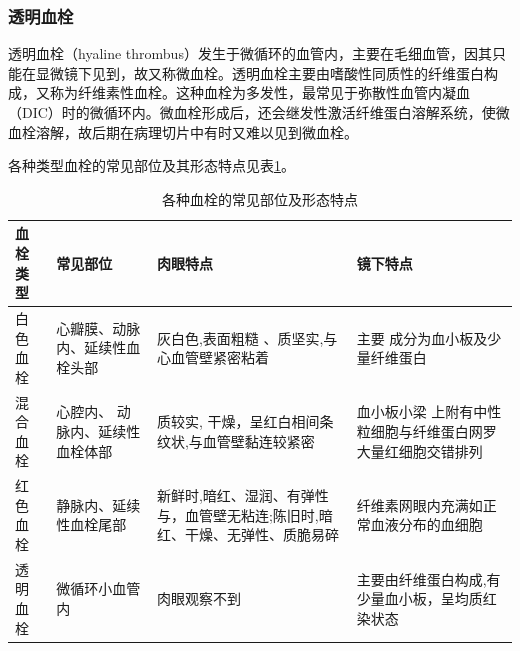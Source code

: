 \subsubsection{透明血栓}

透明血栓（hyaline
thrombus）发生于微循环的血管内，主要在毛细血管，因其只能在显微镜下见到，故又称微血栓。透明血栓主要由嗜酸性同质性的纤维蛋白构成，又称为纤维素性血栓。这种血栓为多发性，最常见于弥散性血管内凝血（DIC）时的微循环内。微血栓形成后，还会继发性激活纤维蛋白溶解系统，使微血栓溶解，故后期在病理切片中有时又难以见到微血栓。

各种类型血栓的常见部位及其形态特点见表\ref{tab3-1}。

\begin{table}[ht]
  \caption{各种血栓的常见部位及形态特点}
  \label{tab3-1}
  \centering
  \begin{tabular}{lp{4cm}p{4cm}p{4cm}}
    \toprule
    血栓类型                                    & 常见部位                                                                      & 肉眼特点                                                    & 镜下特点 \\
    \midrule
    白色血栓                                    & 心瓣膜、动脉内、延续性血栓头部                                                &
    灰白色,表面粗糙 、质坚实,与心血管壁紧密粘着 & 主要 成分为血小板及少量纤维蛋白                                                                                                                        \\
    混合血栓                                    & 心腔内、 动脉内、延续性血栓体部
                                                & 质较实, 干燥，呈红白相间条纹状,与血管壁黏连较紧密                             & 血小板小梁 上附有中性粒细胞与纤维蛋白网罗大量红细胞交错排列            \\
    红色血栓                                    & 静脉内、延续性血栓尾部
                                                & 新鲜时,暗红、湿润、有弹性与，血管壁无粘连;陈旧时,暗红、干燥、无弹性、质脆易碎
                                                & 纤维素网眼内充满如正常血液分布的血细胞                                                                                                                 \\
    透明血栓                                    & 微循环小血管内                                                                & 肉眼观察不到                                                &
    主要由纤维蛋白构成,有少量血小板，呈均质红染状态                                                                                                                                                      \\
    \bottomrule
  \end{tabular}
\end{table}

